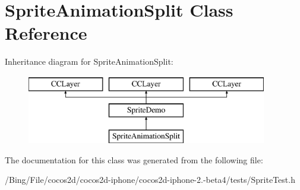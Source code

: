 \hypertarget{interface_sprite_animation_split}{\section{Sprite\-Animation\-Split Class Reference}
\label{interface_sprite_animation_split}
}
Inheritance diagram for Sprite\-Animation\-Split\-:\begin{figure}[H]
\begin{center}
\leavevmode
\includegraphics[height=3.000000cm]{interface_sprite_animation_split}
\end{center}
\end{figure}


The documentation for this class was generated from the following file\-:\begin{DoxyCompactItemize}
\item 
/\-Bing/\-File/cocos2d/cocos2d-\/iphone/cocos2d-\/iphone-\/2.-\/beta4/tests/Sprite\-Test.\-h\end{DoxyCompactItemize}
